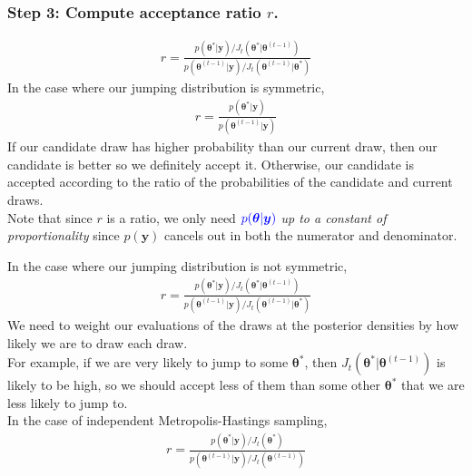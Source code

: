 \documentclass[handout]{beamer}
\begin{document}
\begin{frame}
\frametitle{Step 3: Compute acceptance ratio $r$.}
\pause
\begin{eqnarray*}
r = \frac{p(\bm{\theta}^* | \bm{y})/J_t(\bm{\theta}^* | \bm{\theta}^{(t-1)})}{p(\bm{\theta}^{(t-1)} | \bm{y})/J_t(\bm{\theta}^{(t-1)} | \bm{\theta}^*)}
\end{eqnarray*}
\pause
In the case where our jumping distribution is symmetric,
\begin{eqnarray*}
r = \frac{p(\bm{\theta}^* | \bm{y})}{p(\bm{\theta}^{(t-1)} | \bm{y})}
\end{eqnarray*}
\pause
If our candidate draw has higher probability than our current draw,
then our candidate is better so we definitely accept it.  \pause
Otherwise, our candidate is accepted according to the ratio of the
probabilities of the candidate and current draws. \\
\bigskip
\pause
Note that since $r$ is a ratio, we only need $\textcolor{blue}{p(\bm{\theta} |
\bm{y})}$ \textit{up to a constant of proportionality} since
$p(\bm{y})$ cancels out in both the numerator and denominator.
\end{frame}

\begin{frame}
In the case where our jumping distribution is not symmetric,
\begin{eqnarray*}
r = \frac{p(\bm{\theta}^* | \bm{y})/J_t(\bm{\theta}^* | \bm{\theta}^{(t-1)})}{p(\bm{\theta}^{(t-1)} | \bm{y})/J_t(\bm{\theta}^{(t-1)} | \bm{\theta}^*)}
\end{eqnarray*}
\pause
We need to weight our evaluations of the draws at the posterior
densities by how likely we are to draw each draw.  \\
\bigskip
\pause
For example, if we are very likely to jump to some $\bm{\theta}^*$,
then $J_t(\bm{\theta}^* | \bm{\theta}^{(t-1)})$ is likely to be high,
so we should accept less of them than some other $\bm{\theta}^*$ that
we are less likely to jump to.\\
\pause
\bigskip
In the case of independent Metropolis-Hastings sampling,
\begin{eqnarray*}
r = \frac{p(\bm{\theta}^* | \bm{y})/J_t(\bm{\theta}^*)}{p(\bm{\theta}^{(t-1)} | \bm{y})/J_t(\bm{\theta}^{(t-1)})}
\end{eqnarray*}

\end{frame}
\end{document}
